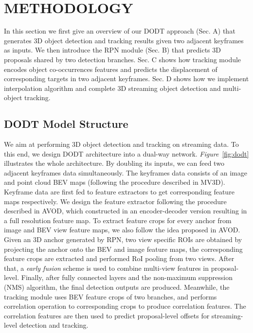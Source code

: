 \documentclass[letterpaper, 10 pt, conference]{ieeeconf}  %
\def\figurename{\emph{Figure}}
\begin{document}

\section{METHODOLOGY}

In this section we first give an overview of our DODT approach (Sec. A) that generates 3D object detection and tracking results given two adjacent keyframes as inputs. We then introduce the RPN module (Sec. B) that predicts 3D proposals shared by two detection branches. Sec. C shows how tracking module encodes object co-occurrences features and predicts the displacement of corresponding targets in two adjacent keyframes. Sec. D shows how we implement interpolation algorithm and complete 3D streaming object detection and multi-object tracking.

\subsection{DODT Model Structure} 

We aim at performing 3D object detection and tracking on streaming data. To this end, we design DODT architecture into a dual-way network. \figurename \, \ref{fig:dodt} illustrates the whole architecture. By doubling its inputs, we can feed two adjacent keyframes data simultaneously. The keyframes data consists of an image and point cloud BEV maps (following the procedure described in MV3D\cite{chen2017multi}). Keyframe data are first fed to feature extractors to get corresponding feature maps respectively. We design the feature extractor following the procedure described in AVOD\cite{ku2018joint}, which constructed in an encoder-decoder version resulting in a full resolution feature map. To extract feature crops for every anchor from image and BEV view feature maps, we also follow the idea proposed in AVOD. Given an 3D anchor generated by RPN, two view specific ROIs are obtained by projecting the anchor onto the BEV and image feature maps, the corresponding feature crops are extracted and performed RoI pooling from two views. After that, a \textit{early fusion} scheme is used to combine multi-view features in proposal-level. Finally, after fully connected layers and the non-maximum suppression (NMS) algorithm, the final detection outputs are produced. Meanwhile, the tracking module uses BEV feature crops of two branches, and performs correlation operation to corresponding crops to produce correlation features. The correlation features are then used to predict proposal-level offsets for streaming-level detection and tracking.
\end{document}
